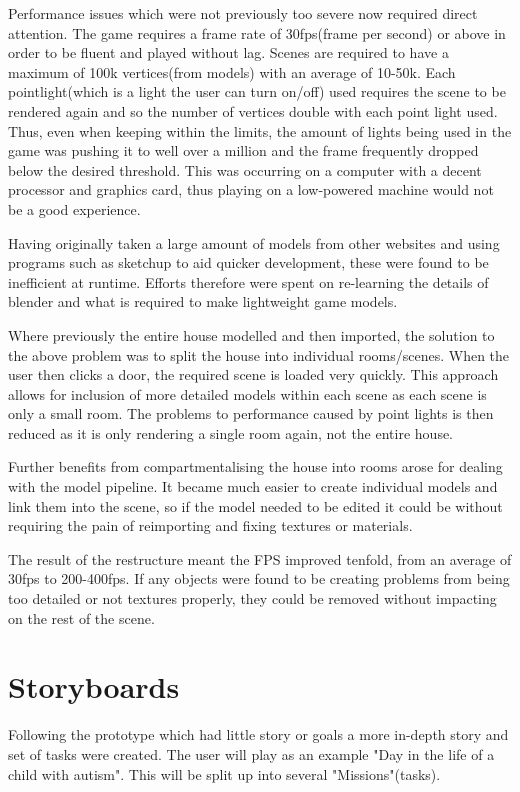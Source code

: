 \documentclass[11pt]{report}
\begin{document}
Performance issues which were not previously too severe now required direct attention. The game requires a frame rate of 30fps(frame per second) or above in order to be fluent and played without lag. Scenes are required to have a maximum of 100k vertices(from models) with an average of 10-50k. Each pointlight(which is a light the user can turn on/off) used requires the scene to be rendered again and so the number of vertices double with each point light used. Thus, even when keeping within the limits, the amount of lights being used in the game was pushing it to well over a million and the frame frequently dropped below the desired threshold. This was occurring on a computer with a decent processor and graphics card, thus playing on a low-powered machine would not be a good experience.  

Having originally taken a large amount of models from other websites and using programs such as sketchup to aid quicker development, these were found to be inefficient at runtime. Efforts therefore were spent on re-learning the details of blender and what is required to make lightweight game models. 

Where previously the entire house modelled and then imported, the solution to the above problem was to split the house into individual rooms/scenes. When the user then clicks a door, the required scene is loaded very quickly. This approach allows for inclusion of more detailed models within each scene as each scene is only a small room. The problems to performance caused by point lights is then reduced as it is only rendering a single room again, not the entire house. 

Further benefits from compartmentalising the house into rooms arose for dealing with the model pipeline. It became much easier to create individual models and link them into the scene, so if the model needed to be edited it could be without requiring the pain of reimporting and fixing textures or materials. 

The result of the restructure meant the FPS improved tenfold, from an average of 30fps to 200-400fps. If any objects were found to be creating problems from being too detailed or not textures properly, they could be removed without impacting on the rest of the scene.

\section{Storyboards}
Following the prototype which had little story or goals a more in-depth story and set of tasks were created. The user will play as an example "Day in the life of a child with autism". This will be split up into several "Missions"(tasks).
\end{document}
